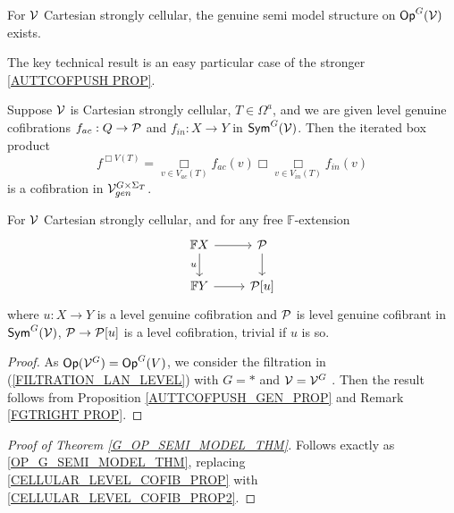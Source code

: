 \documentclass[a4paper,10pt]{article}%
\begin{document}
\begin{theorem}
  \label{G_OP_SEMI_MODEL_THM}
  For $\V$ Cartesian strongly cellular, the genuine semi model structure on $\Op^G(\V)$ exists.
\end{theorem}

The key technical result is an easy particular case of the stronger \ref{AUTTCOFPUSH PROP}.
\begin{proposition}
\label{AUTTCOFPUSH_GEN_PROP} 
  Suppose $\V$ is Cartesian strongly cellular, $T\in \Omega^a$, and we are given level genuine cofibrations $f_{ac}: Q \to \P$ and $f_{in}: X \to Y$ in  $\Sym^G(\V)$. Then the iterated box product 
  \[ 
  f^{\Box V(T)} = \mathop{\Box}\limits_{v \in V_{ac}(T)} f_{ac}(v) \Box \mathop{\Box}\limits_{v\in V_{in}(T)}f_{in}(v) 
  \] 
  is a cofibration in $\V^{G\times \Sigma_T}_{gen}$.
\end{proposition}

\begin{corollary}\label{CELLULAR_LEVEL_COFIB_PROP2} 
  For $\V$ Cartesian strongly cellular, and for any free $\mathbb F$-extension  
  \[ 
  \begin{tikzcd} 
    \mathbb F X \arrow[d, "u"'] \arrow[r] & \P \arrow[d]\\ 
    \mathbb F Y \arrow[r] & \P[u] 
  \end{tikzcd} 
  \] 
  where $u: X \to Y$ is a level genuine cofibration and $\P$ is level genuine cofibrant in $\Sym^G(\V)$, $\P \to \P[u]$ is a level cofibration, trivial if $u$ is so. 
\end{corollary}  
\begin{proof} 
  As $\Op(\V^G) = \Op^G(V)$, we consider the filtration in (\ref{FILTRATION_LAN_LEVEL}) with $G = *$ and $\V = \V^G$ . Then the result follows from Proposition \ref{AUTTCOFPUSH_GEN_PROP} and Remark \ref{FGTRIGHT PROP}.
\end{proof} 

\begin{proof}[Proof of Theorem \ref{G_OP_SEMI_MODEL_THM}]
  Follows exactly as \ref{OP_G_SEMI_MODEL_THM}, replacing \ref{CELLULAR_LEVEL_COFIB_PROP} with \ref{CELLULAR_LEVEL_COFIB_PROP2}.  
\end{proof}


\end{document}
